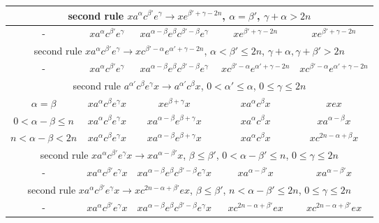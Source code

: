 \documentclass{article}
\theoremstyle{definition}
\begin{document}
\begin{center}
\begin{tabular}{|c|c|c|c|c|}
\hline
\multicolumn{5}{|c|}{second rule $x a^\alpha c^{\beta'} e^\gamma \rightarrow x e^{\beta'+\gamma-2n}$,  $\alpha=\beta'$, $\gamma+\alpha> 2n$}\\
\hline
- & $ x a^\alpha c^{\beta'} e^\gamma  $ &  $  x  a^{\alpha - \beta} e^\beta c^{\beta'-\beta} e^\gamma $ & $   x e^{\beta'+\gamma-2n} $ &  $ x e^{\beta'+\gamma-2n}  $ \\
\hline
\multicolumn{5}{|c|}{second rule $x a^\alpha c^{\beta'} e^\gamma \rightarrow x c^{\beta' - \alpha} e^{\alpha'+\gamma-2n}$,  $\alpha<\beta' \le 2n$, $\gamma+\alpha, \gamma+\beta' > 2n$}\\
\hline
- & $ x a^\alpha c^{\beta'} e^\gamma  $ &  $  x  a^{\alpha - \beta} e^\beta c^{\beta'-\beta} e^\gamma $ & $   x c^{\beta' - \alpha} e^{\alpha'+\gamma-2n} $ &  $ x c^{\beta' - \alpha} e^{\alpha'+\gamma-2n}  $ \\
\hline
\multicolumn{5}{|c|}{second rule $a^{\alpha'} c^\beta e^\gamma x  \rightarrow a^{\alpha'} c^\beta x $, $0<\alpha' \le \alpha$, $0 \le \gamma \le 2n$}\\
\hline
$\alpha=\beta$&  $ x a^\alpha c^{\beta}  e^\gamma x $ &  $  x  e^{\beta+\gamma}  x $ &   $   x a^{\alpha} c^\beta  x  $ &  $ x e x $\\
\hline
$0< \alpha-\beta \le n$&  $ x a^\alpha c^{\beta}  e^\gamma x $ &  $  x  a^{\alpha - \beta} e^{\beta+\gamma}  x $ &   $   x a^{\alpha} c^\beta  x  $ &  $ x  a^{\alpha - \beta} x $\\
\hline
$n< \alpha-\beta < 2n$&  $ x a^\alpha c^{\beta}  e^\gamma x $ &  $  x  a^{\alpha - \beta} e^{\beta+\gamma}  x $ &   $   x a^{\alpha} c^\beta  x  $ &  $ x  c^{2n-\alpha +\beta} x $\\
\hline
\multicolumn{5}{|c|}{second rule $x a^\alpha c^{\beta'} e^\gamma x \rightarrow x a^{\alpha-\beta'} x$, $\beta\le \beta'$, $0<\alpha-\beta'\le n$, $0 \le \gamma \le 2n$}\\
\hline
- &  $ x a^\alpha c^{\beta'}  e^\gamma x $ &  $ x  a^{\alpha - \beta} e^\beta c^{\beta'-\beta} e^\gamma  x $ &   $   x a^{\alpha-\beta'}  x  $ &  $ x  a^{\alpha-\beta'} x $\\
\hline
\multicolumn{5}{|c|}{second rule $x a^\alpha c^{\beta'} e^\gamma x \rightarrow x c^{2n-\alpha+\beta'}ex$, $\beta\le \beta'$, $n<\alpha-\beta'\le 2n$, $0 \le \gamma \le 2n$}\\
\hline
- &  $ x a^\alpha c^{\beta'}  e^\gamma x $ &  $ x  a^{\alpha - \beta} e^\beta c^{\beta'-\beta} e^\gamma  x $ &   $   x c^{2n-\alpha+\beta'}e   x  $ &  $ x   c^{2n-\alpha+\beta'}e x $\\

\end{tabular}
\end{center}
\end{document}
